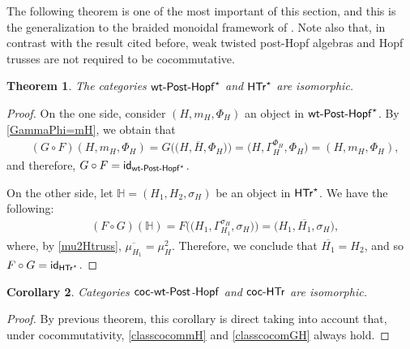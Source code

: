 \documentclass[10pt,a4paper]{amsart}
\numberwithin{equation}{section}
\newtheorem{Theorem}{Theorem}[section]
\newtheorem{Corollary}[Theorem]{Corollary}
\begin{document}
The following theorem is one of the most important of this section, and this is the generalization to the braided monoidal framework of \cite[Theorem 6.7]{Wang}. Note also that, in contrast with the result cited before, weak twisted post-Hopf algebras and Hopf trusses are not required to be cocommutative.
\begin{Theorem}\label{th-iso-wtph-htr}
The categories ${\sf wt}\textnormal{-}{\sf Post}\textnormal{-}{\sf Hopf}^{\star}$ and $\sf{HTr}^{\star}$ are isomorphic.
\end{Theorem}
\begin{proof}
On the one side, consider $(H,m_{H},\Phi_{H})$ an object in ${\sf wt}\textnormal{-}{\sf Post}\textnormal{-}{\sf Hopf}^{\star}$. By \eqref{GammaPhi=mH}, we obtain that
\begin{align*}
&(G\circ F)(H,m_{H},\Phi_{H})=G\bigl(\bigl(H,\overline{H},\Phi_{H}\bigr)\bigr)=\bigl(H,\Gamma_{H}^{\Phi_{H}},\Phi_{H}\bigr)=(H,m_{H},\Phi_{H}),
\end{align*}
and therefore, $G\circ F={\sf id}_{{\sf wt}\textnormal{-}{\sf Post}\textnormal{-}{\sf Hopf}^{\star}}$.

On the other side, let $\mathbb{H}=(H_{1},H_{2},\sigma_{H})$ be an object in $\sf{HTr}^{\star}$. We have the following:
\begin{align*}
&(F\circ G)(\mathbb{H})=F\bigl(\bigl(H_{1},\Gamma_{H_{1}}^{\sigma_{H}},\sigma_{H}\bigr)\bigr)=\bigl(H_{1},\overline{H_{1}},\sigma_{H}\bigr),
\end{align*}
where, by \eqref{mu2Htruss}, $\overline{\mu_{H_{1}}}=\mu_{H}^{2}$. Therefore, we conclude that $\overline{H_{1}}=H_{2}$, and so $F\circ G={\sf id}_{\sf{HTr}^{\star}}$.
\end{proof}

\begin{Corollary}\label{cor-iso-cocwtph-cochtr}
Categories $\sf{coc}\textnormal{-}{\sf wt}\textnormal{-}{\sf Post}$-$\sf{Hopf}$ and $\sf{coc}\textnormal{-}{\sf HTr}$ are isomorphic.
\end{Corollary}
\begin{proof}
By previous theorem, this corollary is direct taking into account that, under cocommutativity, \eqref{classcocommH} and \eqref{classcocomGH} always hold.
\end{proof}
\end{document}
